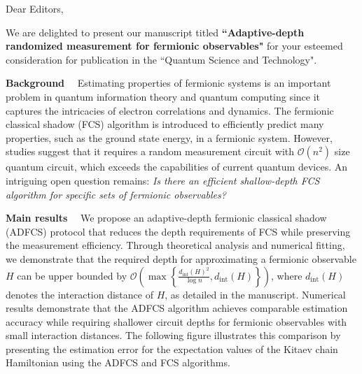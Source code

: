 \documentclass[a4paper, 12pt]{article}
\newcommand{\cbra}[1]{\left\{ #1 \right\}}
\newcommand{\pbra}[1]{\left( #1 \right)}
\begin{document}
\thispagestyle{empty}

\noindent Dear Editors,

\medskip 
\noindent We are delighted to present our manuscript titled \textbf{``Adaptive-depth randomized measurement for fermionic observables"} for your esteemed consideration for publication in the ``Quantum Science and Technology". 

\vspace{8pt}
\noindent \textbf{Background} \ \ Estimating properties of fermionic systems is an important problem in quantum information theory and quantum computing since it captures the intricacies of electron correlations and dynamics. The fermionic classical shadow (FCS) algorithm is introduced to efficiently predict many properties, such as the ground state energy, in a fermionic system. However, studies suggest that it requires a random measurement circuit with $\mathcal{O}(n^2)$ size quantum circuit, which exceeds the capabilities of current quantum devices. An intriguing open question remains: 
\emph{Is there an efficient shallow-depth FCS algorithm for specific sets of fermionic observables?}

\vspace{8pt}
\noindent \textbf{Main results} \ \ 
We propose an adaptive-depth fermionic classical shadow (ADFCS) protocol that reduces the depth requirements of FCS while preserving the measurement efficiency. Through theoretical analysis and numerical fitting, we demonstrate that the required depth for approximating a fermionic observable $H$ can be upper bounded by $\mathcal{O}\pbra{\max\cbra{\frac{d_{\text{int}}(H)^2}{\log n}, d_{\text{int}}(H)}}$, where $d_{\text{int}}(H)$ denotes the interaction distance of $H$, as detailed in the manuscript. Numerical results demonstrate that the ADFCS algorithm achieves comparable estimation accuracy while requiring shallower circuit depths for fermionic observables with small interaction distances. The following figure illustrates this comparison by presenting the estimation error for the expectation values of the Kitaev chain Hamiltonian using the ADFCS and FCS algorithms.
\end{document}
